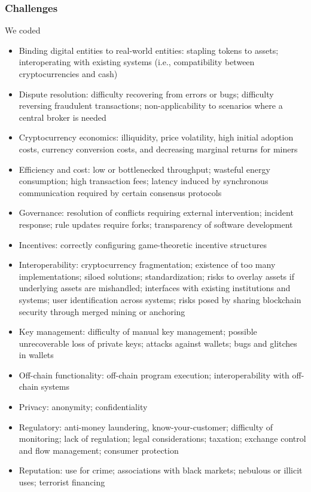 {\subsubsection{Challenges}
We coded 
\begin{itemize}
	\item{Binding digital entities to real-world entities: stapling tokens to assets; interoperating with existing systems (i.e., compatibility between cryptocurrencies and cash)}
	\item{Dispute resolution: difficulty recovering from errors or bugs; difficulty reversing fraudulent transactions; non-applicability to scenarios where a central broker is needed}
	\item{Cryptocurrency economics: illiquidity, price volatility, high initial adoption costs, currency conversion costs, and decreasing marginal returns for miners}
	\item{Efficiency and cost: low or bottlenecked throughput; wasteful energy consumption; high transaction fees; latency induced by synchronous communication required by certain consensus protocols}
	\item{Governance: resolution of conflicts requiring external intervention; incident response; rule updates require forks; transparency of software development}
	\item{Incentives: correctly configuring game-theoretic incentive structures}
	\item{Interoperability: cryptocurrency fragmentation; existence of too many implementations; siloed solutions; standardization; risks to overlay assets if underlying assets are mishandled; interfaces with existing institutions and systems; user identification across systems; risks posed by sharing blockchain security through merged mining or anchoring}
	\item{Key management: difficulty of manual key management; possible unrecoverable loss of private keys; attacks against wallets; bugs and glitches in wallets}
	\item{Off-chain functionality: off-chain program execution; interoperability with off-chain systems}
	\item{Privacy: anonymity; confidentiality}
	\item{Regulatory: anti-money laundering, know-your-customer; difficulty of monitoring; lack of regulation; legal considerations; taxation; exchange control and flow management; consumer protection}
	\item{Reputation: use for crime; associations with black markets; nebulous or illicit uses; terrorist financing}

\end{itemize}}
